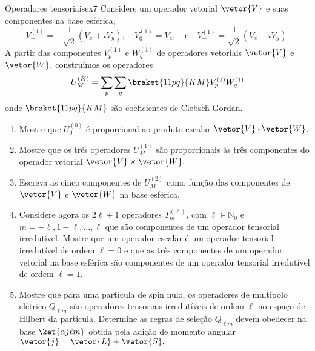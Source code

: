 \begin{exercício}{Operadores tensoriais}{ex7}
   Considere um operador vetorial \(\vetor{V}\) e suas componentes na base esférica, 
   \begin{equation*}
      V^{(1)}_+ = - \frac{1}{\sqrt{2}}(V_x + i V_y),\quad
      V^{(1)}_0 = V_z,\quad\text{e}\quad
      V^{(1)}_- = \frac{1}{\sqrt{2}}(V_x - i V_y).
   \end{equation*}
   A partir das componentes \(V_p^{(1)}\) e \(W_q^{(1)}\) de operadores vetoriais \(\vetor{V}\) e \(\vetor{W},\) construímos os operadores
   \begin{equation*}
      U^{(K)}_M = \sum_p \sum_q \braket{11pq}{KM} V_p^{(1)} W_q^{(1)}
   \end{equation*}
   onde \(\braket{11pq}{KM}\) são coeficientes de Clebsch-Gordan.
   \begin{enumerate}[label=(\alph*)]
      \item Mostre que \(U^{(0)}_0\) é proporcional ao produto escalar \(\vetor{V} \cdot \vetor{W}.\)
      \item Mostre que os três operadores \(U^{(1)}_M\) são proporcionais às três componentes do operador vetorial \(\vetor{V} \times \vetor{W}.\)
      \item Escreva as cinco componentes de \(U_M^{(2)}\) como função das componentes de \(\vetor{V}\) e \(\vetor{W}\) na base esférica.
      \item Considere agora os \(2\ell + 1\) operadores \(T^{(\ell)}_m\), com \(\ell \in \mathbb{N}_0\) e \(m = - \ell, 1 - \ell , \dots, \ell\) que são componentes de um operador tensorial irredutível. Mostre que um operador escalar é um operador tensorial irredutível de ordem \(\ell = 0\) e que as três componentes de um operador vetorial na base esférica são componentes de um operador tensorial irredutível de ordem \(\ell = 1\).
      \item Mostre que para uma partícula de spin nulo, os operadores de multipolo elétrico \(Q_{\ell m}\) são operadores tensoriais irredutíveis de ordem \(\ell\) no espaço de Hilbert da partícula. Determine as regras de seleção \(Q_{\ell m}\) devem obedecer na base \(\ket{\alpha j \ell  m}\) obtida pela adição de momento angular \(\vetor{j} = \vetor{L} + \vetor{S}.\)
   \end{enumerate}
\end{exercício}
